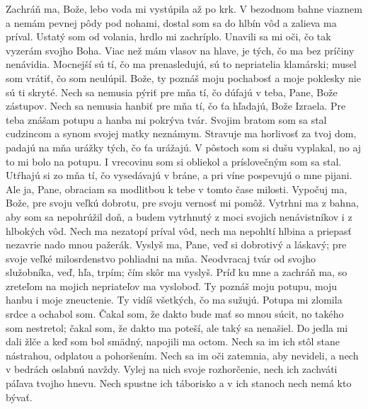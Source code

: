 Zachráň ma, Bože, lebo voda mi vystúpila až po krk.
\versseparator
V bezodnom bahne viaznem a nemám pevnej pôdy pod nohami,
\versseparator
dostal som sa do hlbín vôd a zalieva ma príval.
\versseparator
Ustatý som od volania, hrdlo mi zachríplo.
Unavili sa mi oči, čo tak vyzerám svojho Boha.
\versseparator
Viac než mám vlasov na hlave,
je tých, čo ma bez príčiny nenávidia.
\versseparator
Mocnejší sú tí, čo ma prenasledujú, sú to nepriatelia klamárski;
musel som vrátiť, čo som neulúpil.
\versseparator
Bože, ty poznáš moju pochabosť
a moje poklesky nie sú ti skryté.
\versseparator
Nech sa nemusia pýriť pre mňa tí, čo dúfajú v teba,
Pane, Bože zástupov.
\versseparator
Nech sa nemusia hanbiť pre mňa tí,
čo ťa hľadajú, Bože Izraela.
\versseparator
Pre teba znášam potupu
a hanba mi pokrýva tvár.
\versseparator
Svojim bratom som sa stal cudzincom
a synom svojej matky neznámym.
\versseparator
Stravuje ma horlivosť za tvoj dom,
padajú na mňa urážky tých, čo ťa urážajú.
\versseparator
V pôstoch som si dušu vyplakal,
no aj to mi bolo na potupu.
\versseparator
I vrecovinu som si obliekol
a príslovečným som sa stal.
\versseparator
Utŕhajú si zo mňa tí, čo vysedávajú v bráne,
a pri víne pospevujú o mne pijani.
\versseparator
Ale ja, Pane, obraciam sa modlitbou k tebe
v tomto čase milosti.
\versseparator
Vypočuj ma, Bože, pre svoju veľkú dobrotu,
pre svoju vernosť mi pomôž.
\versseparator
Vytrhni ma z bahna, aby som sa nepohrúžil doň,
a budem vytrhnutý z moci svojich nenávistníkov
i z hlbokých vôd.
\versseparator
Nech ma nezatopí príval vôd,
nech ma nepohltí hlbina
a priepasť nezavrie nado mnou pažerák.
\versseparator
Vyslyš ma, Pane, veď si dobrotivý a láskavý;
pre svoje veľké milosrdenstvo pohliadni na mňa.
\versseparator
Neodvracaj tvár od svojho služobníka,
veď, hľa, trpím; čím skôr ma vyslyš.
\versseparator
Príď ku mne a zachráň ma,
so zreteľom na mojich nepriateľov ma vysloboď.
\versseparator
Ty poznáš moju potupu,
moju hanbu i moje zneuctenie.
\versseparator
Ty vidíš všetkých, čo ma sužujú.
Potupa mi zlomila srdce a ochabol som.
\versseparator
Čakal som, že dakto bude mať so mnou súcit, no takého som nestretol;
čakal som, že dakto ma poteší, ale taký sa nenašiel.
\versseparator
Do jedla mi dali žlče
a keď som bol smädný, napojili ma octom.
\versseparator
Nech sa im ich stôl stane nástrahou,
odplatou a pohoršením.
\versseparator
Nech sa im oči zatemnia, aby nevideli,
a nech v bedrách oslabnú navždy.
\versseparator
Vylej na nich svoje rozhorčenie,
nech ich zachváti páľava tvojho hnevu.
\versseparator
Nech spustne ich táborisko
a v ich stanoch nech nemá kto bývať.

